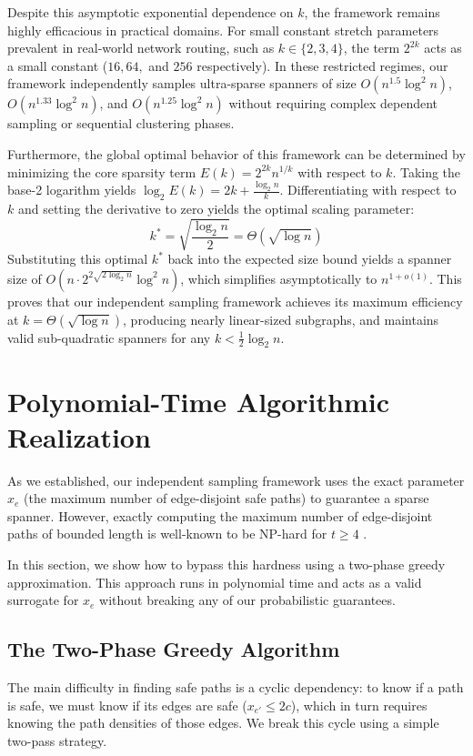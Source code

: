 \documentclass[11pt,a4paper]{article}
\begin{document}
Despite this asymptotic exponential dependence on $k$, the framework remains highly efficacious in practical domains. For small constant stretch parameters prevalent in real-world network routing, such as $k \in \{2, 3, 4\}$, the term $2^{2k}$ acts as a small constant ($16, 64,$ and $256$ respectively). In these restricted regimes, our framework independently samples ultra-sparse spanners of size $O(n^{1.5} \log^2 n)$, $O(n^{1.33} \log^2 n)$, and $O(n^{1.25} \log^2 n)$ without requiring complex dependent sampling or sequential clustering phases.

Furthermore, the global optimal behavior of this framework can be determined by minimizing the core sparsity term $E(k) = 2^{2k} n^{1/k}$ with respect to $k$. Taking the base-2 logarithm yields $\log_2 E(k) = 2k + \frac{\log_2 n}{k}$. Differentiating with respect to $k$ and setting the derivative to zero yields the optimal scaling parameter:
\[
k^* = \sqrt{\frac{\log_2 n}{2}} = \Theta(\sqrt{\log n})
\]
Substituting this optimal $k^*$ back into the expected size bound yields a spanner size of $O(n \cdot 2^{2\sqrt{2\log_2 n}} \log^2 n)$, which simplifies asymptotically to $n^{1+o(1)}$. This proves that our independent sampling framework achieves its maximum efficiency at $k = \Theta(\sqrt{\log n})$, producing nearly linear-sized subgraphs, and maintains valid sub-quadratic spanners for any $k < \frac{1}{2} \log_2 n$.

\section{Polynomial-Time Algorithmic Realization}
As we established, our independent sampling framework uses the exact parameter $x_e$ (the maximum number of edge-disjoint safe paths) to guarantee a sparse spanner. However, exactly computing the maximum number of edge-disjoint paths of bounded length is well-known to be NP-hard for $t \ge 4$ \cite{itai1982complexity}. 

In this section, we show how to bypass this hardness using a two-phase greedy approximation. This approach runs in polynomial time and acts as a valid surrogate for $x_e$ without breaking any of our probabilistic guarantees.

\subsection{The Two-Phase Greedy Algorithm}
The main difficulty in finding safe paths is a cyclic dependency: to know if a path is safe, we must know if its edges are safe ($x_{e'} \le 2c$), which in turn requires knowing the path densities of those edges. We break this cycle using a simple two-pass strategy.
\end{document}
